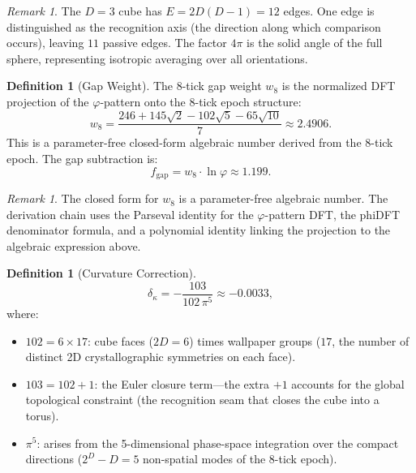 \documentclass[12pt,a4paper]{article}
\theoremstyle{definition}
\newtheorem{definition}[theorem]{Definition}
\theoremstyle{remark}
\newtheorem{remark}[theorem]{Remark}
\begin{document}
\begin{remark}
The $D = 3$ cube has $E = 2D(D-1) = 12$ edges.  One edge is
distinguished as the recognition axis (the direction along which
comparison occurs), leaving $11$ passive edges.  The factor $4\pi$
is the solid angle of the full sphere, representing isotropic
averaging over all orientations.
\end{remark}

\begin{definition}[Gap Weight]
\label{def:gap}
The 8-tick gap weight $w_8$ is the normalized DFT projection of
the $\varphi$-pattern onto the 8-tick epoch structure:
\begin{equation}
  w_8 = \frac{246 + 145\sqrt{2} - 102\sqrt{5} - 65\sqrt{10}}{7}
  \approx 2.4906.
\end{equation}
This is a parameter-free closed-form algebraic number derived from
the 8-tick epoch.  The gap subtraction is:
\begin{equation}
  f_{\mathrm{gap}} = w_8 \cdot \ln\varphi \approx 1.199.
\end{equation}
\end{definition}

\begin{remark}
The closed form for $w_8$ is a parameter-free algebraic number.
The derivation chain uses the Parseval identity for the $\varphi$-pattern DFT,
the phiDFT denominator formula, and a polynomial identity linking
the projection to the algebraic expression above.
\end{remark}

\begin{definition}[Curvature Correction]
\label{def:curvature}
\begin{equation}
  \delta_\kappa = -\frac{103}{102\,\pi^5} \approx -0.0033,
\end{equation}
where:
\begin{itemize}[nosep]
  \item $102 = 6 \times 17$: cube faces ($2D = 6$) times wallpaper
  groups ($17$, the number of distinct 2D crystallographic
  symmetries on each face).
  \item $103 = 102 + 1$: the Euler closure term---the extra $+1$
  accounts for the global topological constraint (the recognition
  seam that closes the cube into a torus).
  \item $\pi^5$: arises from the 5-dimensional phase-space
  integration over the compact directions ($2^D - D = 5$
  non-spatial modes of the 8-tick epoch).
\end{itemize}
\end{definition}
\end{document}

